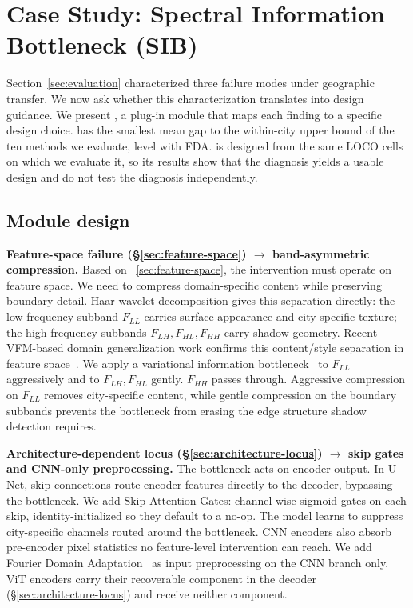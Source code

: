 
\section{Case Study: Spectral Information Bottleneck (SIB)}
\label{sec:sib}

Section~\ref{sec:evaluation} characterized three failure modes under geographic transfer. We now ask whether this characterization translates into design guidance. We present \sib, a plug-in module that maps each finding to a specific design choice. \sib{} has the smallest mean gap to the within-city upper bound of the ten methods we evaluate, level with FDA. \sib{} is designed from the same LOCO cells on which we evaluate it, so its results show that the diagnosis yields a usable design and do not test the diagnosis independently.

\subsection{Module design}
\label{sec:sib-design}



\textbf{Feature-space failure (\S\ref{sec:feature-space}) $\rightarrow$ band-asymmetric compression.} Based on ~\ref{sec:feature-space}, the intervention must operate on feature space. We need to compress domain-specific content while preserving boundary detail. Haar wavelet decomposition gives this separation directly: the low-frequency subband $F_{LL}$ carries surface appearance and city-specific texture; the high-frequency subbands $F_{LH}, F_{HL}, F_{HH}$ carry shadow geometry. Recent VFM-based domain generalization work confirms this content/style separation in feature space~\cite{fada}. We apply a variational information bottleneck~\cite{alemi2017deep} to $F_{LL}$ aggressively and to $F_{LH}, F_{HL}$ gently. $F_{HH}$ passes through. Aggressive compression on $F_{LL}$ removes city-specific content, while gentle compression on the boundary subbands prevents the bottleneck from erasing the edge structure shadow detection requires.

\textbf{Architecture-dependent locus (\S\ref{sec:architecture-locus}) $\rightarrow$ skip gates and CNN-only preprocessing.} The bottleneck acts on encoder output. In U-Net, skip connections route encoder features directly to the decoder, bypassing the bottleneck. We add Skip Attention Gates: channel-wise sigmoid gates on each skip, identity-initialized so they default to a no-op. The model learns to suppress city-specific channels routed around the bottleneck. CNN encoders also absorb pre-encoder pixel statistics no feature-level intervention can reach. We add Fourier Domain Adaptation~\cite{fda} as input preprocessing on the CNN branch only. ViT encoders carry their recoverable component in the decoder (\S\ref{sec:architecture-locus}) and receive neither component.

